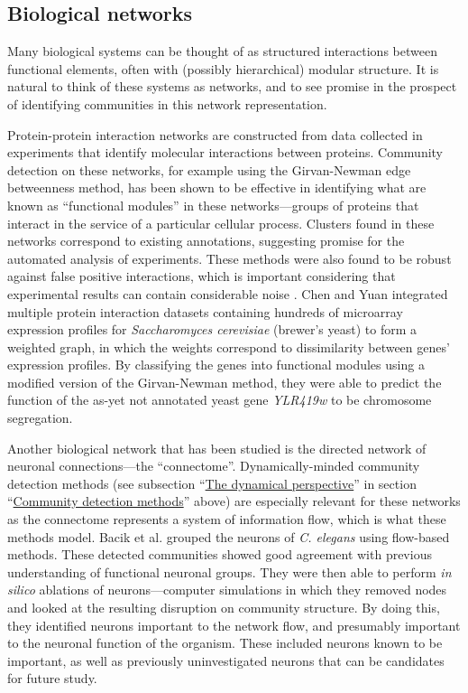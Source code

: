 \hypertarget{biological-networks}{\subsection{Biological
networks}\label{biological-networks}}

Many biological systems can be thought of as structured interactions
between functional elements, often with (possibly hierarchical) modular
structure. It is natural to think of these systems as networks, and to
see promise in the prospect of identifying communities in this network
representation.

Protein-protein interaction networks are constructed from data collected
in experiments that identify molecular interactions between proteins.
Community detection on these networks, for example using the
Girvan-Newman edge betweenness method, has been shown to be effective in
identifying what are known as ``functional modules'' in these
networks---groups of proteins that interact in the service of a
particular cellular process. Clusters found in these networks correspond
to existing annotations, suggesting promise for the automated analysis
of experiments. These methods were also found to be robust against false
positive interactions, which is important considering that experimental
results can contain considerable noise \autocite{dunn_use_2005}. Chen
and Yuan \autocite{chen_detecting_2006} integrated multiple protein
interaction datasets containing hundreds of microarray expression
profiles for \emph{Saccharomyces cerevisiae} (brewer's yeast) to form a
weighted graph, in which the weights correspond to dissimilarity between
genes' expression profiles. By classifying the genes into functional
modules using a modified version of the Girvan-Newman method, they were
able to predict the function of the as-yet not annotated yeast gene
\emph{YLR419w} to be chromosome segregation.

Another biological network that has been studied is the directed network
of neuronal connections---the ``connectome''. Dynamically-minded
community detection methods (see subsection
``\protect\hyperlink{the-dynamical-perspective}{The dynamical
perspective}'' in section
``\protect\hyperlink{community-detection-methods}{Community detection
methods}'' above) are especially relevant for these networks as the
connectome represents a system of information flow, which is what these
methods model. Bacik et al. \autocite{bacik_flow-based_2016} grouped the
neurons of \emph{C. elegans} using flow-based methods. These detected
communities showed good agreement with previous understanding of
functional neuronal groups. They were then able to perform \emph{in
silico} ablations of neurons---computer simulations in which they
removed nodes and looked at the resulting disruption on community
structure. By doing this, they identified neurons important to the
network flow, and presumably important to the neuronal function of the
organism. These included neurons known to be important, as well as
previously uninvestigated neurons that can be candidates for future
study.


